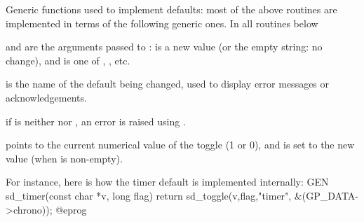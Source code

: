 













\noindent Generic functions used to implement defaults: most of the above
routines are implemented in terms of the following generic ones. In all
routines below

\item {} and  are the arguments passed to :
 is a new value (or the empty string: no change), and  is one
of , , etc.

\item {} is the name of the default being changed, used to display error
messages or acknowledgements.


\item if  is neither  nor , an error is raised using
.

\item {} points to the current numerical value of the toggle (1 or 0),
and is set to the new value (when  is non-empty).

For instance, here is how the timer default is implemented internally:
\bprog
GEN
sd_timer(const char *v, long flag)
{ return sd_toggle(v,flag,"timer", &(GP_DATA->chrono)); }
@eprog

